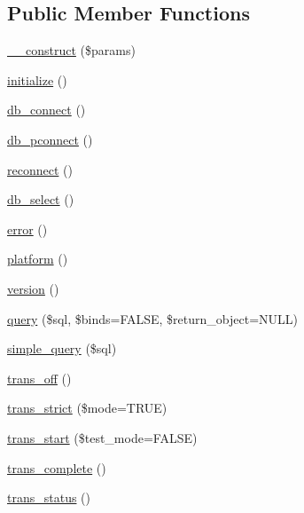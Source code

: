 \subsection*{Public Member Functions}
\begin{DoxyCompactItemize}
\item 
\mbox{\hyperlink{class_c_i___d_b__driver_a9162320adff1a1a4afd7f2372f753a3e}{\+\_\+\+\_\+construct}} (\$params)
\item 
\mbox{\hyperlink{class_c_i___d_b__driver_a91098fa7d1917ce4833f284bbef12627}{initialize}} ()
\item 
\mbox{\hyperlink{class_c_i___d_b__driver_a6aa545dcb7768f0b62d37cdcf7f09adc}{db\+\_\+connect}} ()
\item 
\mbox{\hyperlink{class_c_i___d_b__driver_a0f69e662bd02de5bcf98647068e7c653}{db\+\_\+pconnect}} ()
\item 
\mbox{\hyperlink{class_c_i___d_b__driver_a57c19c642ab3023e28d10c50f86ff0a8}{reconnect}} ()
\item 
\mbox{\hyperlink{class_c_i___d_b__driver_af0c7f2602586ea2050b19fb36baefb24}{db\+\_\+select}} ()
\item 
\mbox{\hyperlink{class_c_i___d_b__driver_a43b8d30b879d4f09ceb059b02af2bc02}{error}} ()
\item 
\mbox{\hyperlink{class_c_i___d_b__driver_ad69bddb2ba31b27415484b3da4213ba8}{platform}} ()
\item 
\mbox{\hyperlink{class_c_i___d_b__driver_a6080dae0886626b9a4cedb29240708b1}{version}} ()
\item 
\mbox{\hyperlink{class_c_i___d_b__driver_a4711d63638a755f763352472063f0bbf}{query}} (\$sql, \$binds=F\+A\+L\+SE, \$return\+\_\+object=N\+U\+LL)
\item 
\mbox{\hyperlink{class_c_i___d_b__driver_a6ac4d82d7ba4e8df07e1367229084c91}{simple\+\_\+query}} (\$sql)
\item 
\mbox{\hyperlink{class_c_i___d_b__driver_ae9080ca6b0a9a258f5e87750b266e337}{trans\+\_\+off}} ()
\item 
\mbox{\hyperlink{class_c_i___d_b__driver_a648f8e6b3d0c53ce2afd63cfcea1fe74}{trans\+\_\+strict}} (\$mode=T\+R\+UE)
\item 
\mbox{\hyperlink{class_c_i___d_b__driver_ab082d21c9a77398c6d6705d9e978fb20}{trans\+\_\+start}} (\$test\+\_\+mode=F\+A\+L\+SE)
\item 
\mbox{\hyperlink{class_c_i___d_b__driver_aa0edd209de428801ce5faa1fe740852e}{trans\+\_\+complete}} ()
\item 
\mbox{\hyperlink{class_c_i___d_b__driver_a7ce49452153f13afde8f9c5212028be6}{trans\+\_\+status}} ()

\end{DoxyCompactItemize}

